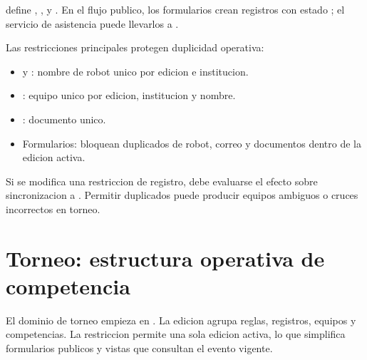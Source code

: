  define , ,  y . En el flujo publico, los formularios crean registros con estado ; el servicio de asistencia puede llevarlos a .

Las restricciones principales protegen duplicidad operativa:

\begin{itemize}
  \item {} y : nombre de robot unico por edicion e institucion.
  \item {}: equipo unico por edicion, institucion y nombre.
  \item {}: documento unico.
  \item Formularios: bloquean duplicados de robot, correo y documentos dentro de la edicion activa.
\end{itemize}

Si se modifica una restriccion de registro, debe evaluarse el efecto sobre sincronizacion a . Permitir duplicados puede producir equipos ambiguos o cruces incorrectos en torneo.

\section{Torneo: estructura operativa de competencia}
\label{sec:modelo-torneo}

El dominio de torneo empieza en . La edicion agrupa reglas, registros, equipos y competencias. La restriccion  permite una sola edicion activa, lo que simplifica formularios publicos y vistas que consultan el evento vigente.


